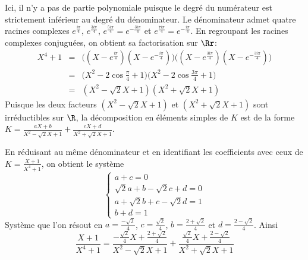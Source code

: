 {\begin{enumerate}
{Ici, il n'y a pas de partie polynomiale puisque le degré du numérateur 
est strictement inférieur au degré du dénominateur. 
Le dénominateur admet quatre racines complexes 
$e^{\frac{i\pi}{4}}$, $e^{\frac{3i\pi}{4}}$, $e^{\frac{5i\pi}{4}}=e^{-\frac{3i\pi}{4}}$ et 
$e^{\frac{7i\pi}{4}}=e^{-\frac{i\pi}{4}}$. 
En regroupant les racines complexes conjuguées, on obtient sa factorisation sur $\Rr$:
\begin{eqnarray*}
X^4+1 &=& \big( (X-e^{\frac{i\pi}{4}})(X-e^{-\frac{i\pi}{4}}) \big)\big( (X-e^{\frac{3i\pi}{4}})(X-e^{-\frac{3i\pi}{4}}) \big) \\
      &=&\big(X^2-2\cos\tfrac{\pi}{4}+1\big)\big(X^2-2\cos\tfrac{3\pi}{4}+1\big)\\
      &=&(X^2-\sqrt{2}X+1)(X^2+\sqrt{2}X+1)
\end{eqnarray*}
Puisque les deux facteurs $(X^2-\sqrt{2}X+1)$ et $(X^2+\sqrt{2}X+1)$ sont irréductibles sur $\R$, la décomposition en éléments simples de $K$ est de la forme
$K=\frac{aX+b}{X^2-\sqrt{2}X+1}+\frac{cX+d}{X^2+\sqrt{2}X+1}$.

En réduisant au même dénominateur et en identifiant les coefficients avec ceux de $K=\frac{X+1}{X^4+1}$, 
on obtient le système
$$\left\{\begin{array}{l}
a+c=0\\
\sqrt{2}a+b-\sqrt{2}c+d=0\\
a+\sqrt{2}b+c-\sqrt{2}d=1\\
b+d=1
\end{array}\right.$$
Système que l'on résout en $a=\frac{-\sqrt{2}}{4}$, $c=\frac{\sqrt{2}}{4}$, $b=\frac{2+\sqrt{2}}{4}$ et $d=\frac{2-\sqrt{2}}{4}$. Ainsi
$$\frac{X+1}{X^4+1} = \frac{-\frac{\sqrt{2}}{4}X+\frac{2+\sqrt{2}}{4}}{X^2-\sqrt{2}X+1} + \frac{\frac{\sqrt{2}}{4}X+\frac{2-\sqrt{2}}{4}}{X^2+\sqrt{2}X+1}$$}
\end{enumerate}
}
